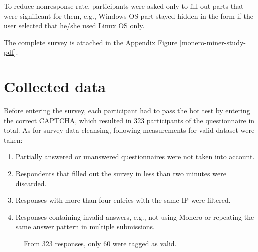 \documentclass[
  printed, %
  table,   %
  lof,     %
  lot,     %
           oneside, color
]{fithesis3}
\begin{document}
To reduce nonresponse rate, participants were asked only to fill out parts that were significant for them, e.g., Windows OS part stayed hidden in the form if the user selected that he/she used Linux OS only. 

The complete survey is attached in the Appendix Figure \ref{monero-miner-study-pdf}.
\section{Collected data}
Before entering the survey, each participant had to pass the bot test by entering the correct CAPTCHA, which resulted in 323 participants of the questionnaire in total. As for survey data cleansing, following measurements for valid dataset were taken:
\begin{enumerate}
\item Partially answered or unanswered questionnaires were not taken into account. 
\item Respondents that filled out the survey in less than two minutes were discarded.
\newpage
\item Responses with more than four entries with the same IP were filtered.
\item Responses containing invalid answers, e.g., not using Monero or repeating the same answer pattern in multiple submissions.
\end{enumerate}

\begin{center}
\begin{figure}[H]
\caption{From 323 responses, only 60 were tagged as valid.}
\label{chart:price}\end{figure}\end{center}
\end{document}
